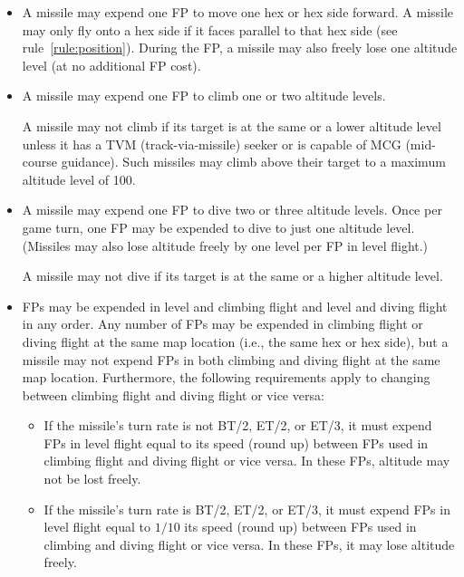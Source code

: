 {

\begin{itemize}

    \item {} A missile may expend one FP to move one hex or hex side forward. A missile may only fly onto a hex side if it faces parallel to that hex side (see rule~\ref{rule:position}). During the FP, a missile may also freely lose one altitude level (at no additional FP cost).

    \item {} A missile may expend one FP to climb one or two altitude levels. 
    
    A missile may not climb if its target is at the same or a lower altitude level unless it has a TVM (track-via-missile) seeker or is capable of MCG (mid-course guidance). Such missiles may climb above their target to a maximum altitude level of 100.

    \item {} A missile may expend one FP to dive two or three altitude levels. Once per game turn, one FP may be expended to dive to just one altitude level. (Missiles may also lose altitude freely by one level per FP in level flight.)

    A missile may not dive if its target is at the same or a higher altitude level.

    \item {} FPs may be expended in level and climbing flight and level and diving flight in any order. Any number of FPs may be expended in climbing flight or diving flight at the same map location (i.e., the same hex or hex side), but a missile may not expend FPs in both climbing and diving flight at the same map location. Furthermore, the following requirements apply to changing between climbing flight and diving flight or vice versa:


    \begin{itemize}

        \item If the missile's turn rate is not BT/2, ET/2, or ET/3, it must expend FPs in level flight equal to {\onethird} its speed (round up) between FPs used in climbing flight and diving flight or vice versa. In these FPs, altitude may not be lost freely.
        
        \item If the missile's turn rate is BT/2, ET/2, or ET/3, it must expend FPs in level flight equal to $1/10$ its speed (round up)  between FPs used in climbing and diving flight or vice versa. In these FPs, it may lose altitude freely.


\end{itemize}
\end{itemize}}
